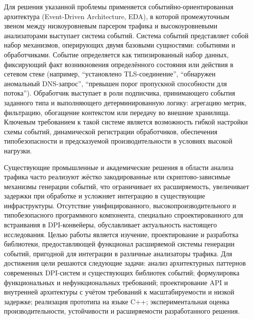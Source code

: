 Для решения указанной проблемы применяется событийно-ориентированная архитектура (Event-Driven Architecture, EDA), в которой промежуточным звеном между низкоуровневым парсером трафика и высокоуровневыми анализаторами выступает система событий.
Система событий представляет собой набор механизмов, оперирующих двумя базовыми сущностями: событиями и обработчиками.
Событие определяется как типизированный набор данных, фиксирующий факт возникновения определённого состояния или действия в сетевом стеке (например, ``установлено TLS-соединение'', ``обнаружен аномальный DNS-запрос'', ``превышен порог пропускной способности для потока'').
Обработчик выступает в роли подписчика, принимающего события заданного типа и выполняющего детерминированную логику: агрегацию метрик, фильтрацию, обогащение контекстом или передачу во внешние хранилища.
Ключевым требованием к такой системе является возможность гибкой настройки схемы событий, динамической регистрации обработчиков, обеспечения типобезопасности и предсказуемой производительности в условиях высокой нагрузки.

Существующие промышленные и академические решения в области анализа трафика часто реализуют жёстко закодированные или скриптово-зависимые механизмы генерации событий, что ограничивает их расширяемость, увеличивает задержки при обработке и усложняет интеграцию в существующие инфраструктуры.
Отсутствие унифицированного, высокопроизводительного и типобезопасного программного компонента, специально спроектированного для встраивания в DPI-конвейеры, обуславливает актуальность настоящего исследования.
Целью работы является изучение, проектирование и разработка библиотеки, предоставляющей функционал расширяемой системы генерации событий, пригодной для интеграции в различные анализаторы трафика.
Для достижения цели решаются следующие задачи: анализ архитектурных паттернов современных DPI-систем и существующих библиотек событий;
формулировка функциональных и нефункциональных требований;
проектирование API и внутренней архитектуры с учётом требований к масштабируемости и низкой задержке;
реализация прототипа на языке C++; экспериментальная оценка производительности, устойчивости и расширяемости разработанного решения.

\newpage

